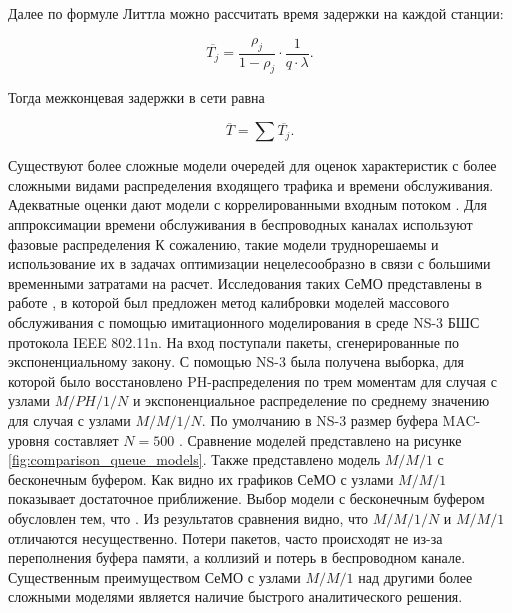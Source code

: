 Далее по формуле Литтла \cite{Little1961} можно рассчитать время задержки на каждой станции:

\begin{displaymath}
    \overline{T_j} = \frac{\rho_j}{1 - \rho_j} \cdot \frac{1}{q \cdot \lambda}.
\end{displaymath}

Тогда межконцевая задержки в сети равна

\begin{equation}
    \label{eq:end_to_end_delay}
    \overline{T}= \sum{\overline{T_j}}.
\end{equation}


Существуют более сложные модели очередей для оценок характеристик с более сложными видами распределения входящего трафика и времени обслуживания. Адекватные оценки дают модели с коррелированными входным потоком \cite{VishnevskyDudin2017, Vishnevsky2017, Vishnevsky2016_Methods_of_performance, Larionov2019}. Для аппроксимации времени обслуживания в беспроводных каналах используют фазовые распределения \cite{Vishnevsky2017, Vishnevsky2016_Methods_of_performance, Larionov2019, Kawanishi2019, Dogan2021} К сожалению, такие модели труднорешаемы и использование их в задачах оптимизации нецелесообразно в связи с большими временными затратами на расчет. Исследования таких СеМО представлены в работе \cite{Larionov2021}, в которой был предложен метод калибровки моделей массового обслуживания с помощью имитационного моделирования в среде NS-3 БШС протокола IEEE 802.11n. На вход поступали пакеты, сгенерированные по экспоненциальному закону. С помощью NS-3 была получена выборка, для которой было восстановлено PH-распределения по трем моментам для случая с узлами $M/PH/1/N$ и экспоненциальное распределение по среднему значению для случая с узлами $M/M/1/N$. По умолчанию в NS-3 размер буфера MAC-уровня составляет $N=500$ \cite{ns-3}. Сравнение моделей представлено на рисунке \cref{fig:comparison_queue_models}. Также представлено модель $M/M/1$ с бесконечным буфером. Как видно их графиков СеМО с узлами $M/M/1$ показывает достаточное приближение. Выбор модели с бесконечным буфером обусловлен тем, что . Из результатов сравнения видно, что $M/M/1/N$ и $M/M/1$ отличаются несущественно. Потери пакетов, часто происходят не из-за переполнения буфера памяти, а коллизий и потерь в беспроводном канале. Существенным преимуществом СеМО с узлами $M/M/1$ над другими более сложными моделями является наличие быстрого аналитического решения.

